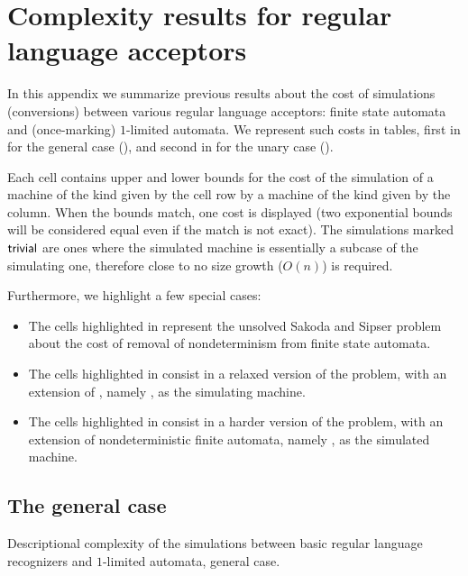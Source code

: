 \chapter{Complexity results for regular language acceptors}\label{app:results}
In this appendix we summarize previous results about the cost of simulations (conversions) between various regular language acceptors: finite state automata and (once-marking) $1$-limited automata.
We represent such costs in tables, first in  for the general case (), and second in  for the unary case ().

Each cell contains upper and lower bounds for the cost of the simulation of a machine of the kind given by the cell row by a machine of the kind given by the column.
When the bounds match, one cost is displayed (two exponential bounds will be considered equal even if the match is not exact).
The simulations marked~$\mathsf{trivial}$ are ones where the simulated machine is essentially a subcase of the simulating one, therefore close to no size growth ($O(n)$) is required.

Furthermore, we highlight a few special cases:
\begin{itemize}
	\item The cells highlighted in  represent the unsolved Sakoda and Sipser problem \cite{SakSip78} about the cost of removal of nondeterminism from finite state automata.
	\item The cells highlighted in  consist in a relaxed version of the problem, with an extension of \TNFAs, namely \ODLAs, as the simulating machine.
	\item The cells highlighted in  consist in a harder version of the problem, with an extension of nondeterministic finite automata, namely \OLAs, as the simulated machine.
\end{itemize}


\section{The general case}\label{sec:sims-general}

\begin{table}
	\centering
	\caption{Descriptional complexity of the simulations between basic regular language recognizers and $1$-limited automata, general case.}
	\label{tab:sims-1la-general}
\end{table}

